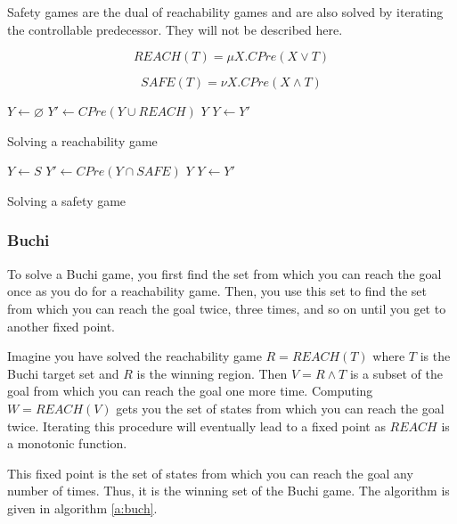 \documentclass[a4paper,twoside,openright,11pt]{book}
\theoremstyle{definition}
\begin{document}
Safety games are the dual of reachability games and are also solved by iterating the controllable predecessor. They will not be described here.

\begin{equation}
REACH(T) = \mu X. CPre(X \vee T)
\label{equ:mu_reach}
\end{equation}

\begin{equation}
SAFE(T) = \nu X. CPre(X \wedge T)
\label{equ:mu_safe}
\end{equation}

\begin{algorithm}[t]
\begin{algorithmic}
\State $Y \gets \varnothing$
\Loop
\State $Y' \gets CPre(Y \cup REACH)$
\State\Return $Y$\EndIf
\State $Y \gets Y'$
\EndLoop
\EndFunction
\end{algorithmic}
\caption{Solving a reachability game}
\label{a:reach}
\end{algorithm}

\begin{algorithm}[t]
\begin{algorithmic}
\State $Y \gets S$
\Loop
\State $Y' \gets CPre(Y \cap SAFE)$
\State\Return $Y$\EndIf
\State $Y \gets Y'$
\EndLoop
\EndFunction
\end{algorithmic}
\caption{Solving a safety game}
\label{a:safe}
\end{algorithm}

\subsubsection{Buchi}

To solve a Buchi game, you first find the set from which you can reach the goal once as you do for a reachability game. Then, you use this set to find the set from which you can reach the goal twice, three times, and so on until you get to another fixed point. 

Imagine you have solved the reachability game $R = REACH(T)$ where $T$ is the Buchi target set and $R$ is the winning region. Then $V = R \wedge T$ is a subset of the goal from which you can reach the goal one more time. Computing $W = REACH(V)$ gets you the set of states from which you can reach the goal twice. Iterating this procedure will eventually lead to a fixed point as $REACH$ is a monotonic function.

This fixed point is the set of states from which you can reach the goal any number of times. Thus, it is the winning set of the Buchi game. The algorithm is given in algorithm \ref{a:buch}.
\end{document}
